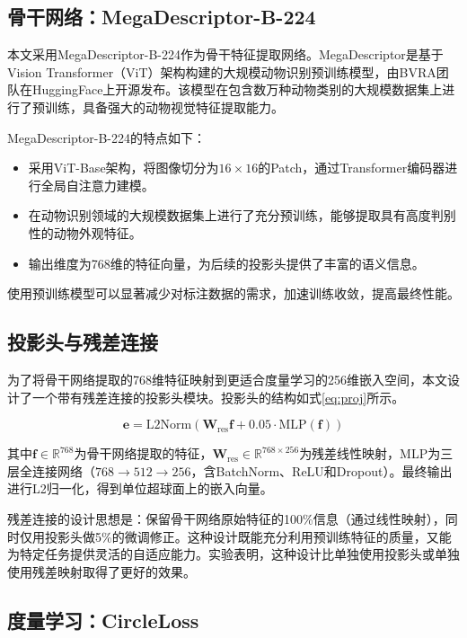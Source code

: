 \documentclass[a4paper]{article}
\begin{document}
\subsection{骨干网络：MegaDescriptor-B-224}

本文采用MegaDescriptor-B-224作为骨干特征提取网络。MegaDescriptor是基于Vision Transformer（ViT）架构构建的大规模动物识别预训练模型，由BVRA团队在HuggingFace上开源发布。该模型在包含数万种动物类别的大规模数据集上进行了预训练，具备强大的动物视觉特征提取能力。

MegaDescriptor-B-224的特点如下：
\begin{itemize}
    \item 采用ViT-Base架构，将图像切分为$16\times16$的Patch，通过Transformer编码器进行全局自注意力建模。
    \item 在动物识别领域的大规模数据集上进行了充分预训练，能够提取具有高度判别性的动物外观特征。
    \item 输出维度为768维的特征向量，为后续的投影头提供了丰富的语义信息。
\end{itemize}

使用预训练模型可以显著减少对标注数据的需求，加速训练收敛，提高最终性能。

\subsection{投影头与残差连接}

为了将骨干网络提取的768维特征映射到更适合度量学习的256维嵌入空间，本文设计了一个带有残差连接的投影头模块。投影头的结构如式\ref{eq:proj}所示。

\begin{equation}
\label{eq:proj}
\mathbf{e} = \text{L2Norm}\left(\mathbf{W}_{\text{res}}\mathbf{f} + 0.05 \cdot \text{MLP}(\mathbf{f})\right)
\end{equation}

其中$\mathbf{f}\in\mathbb{R}^{768}$为骨干网络提取的特征，$\mathbf{W}_{\text{res}}\in\mathbb{R}^{768\times256}$为残差线性映射，MLP为三层全连接网络（$768\rightarrow512\rightarrow256$，含BatchNorm、ReLU和Dropout）。最终输出进行L2归一化，得到单位超球面上的嵌入向量。

残差连接的设计思想是：保留骨干网络原始特征的100\%信息（通过线性映射），同时仅用投影头做5\%的微调修正。这种设计既能充分利用预训练特征的质量，又能为特定任务提供灵活的自适应能力。实验表明，这种设计比单独使用投影头或单独使用残差映射取得了更好的效果。

\subsection{度量学习：CircleLoss}
\end{document}
